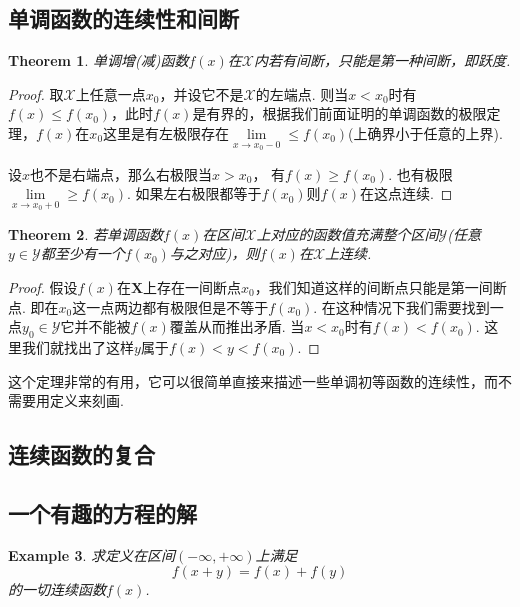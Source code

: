 \documentclass{article}
\newtheorem{theorem}{Theorem}[section]
\newtheorem{example}[theorem]{Example}
\begin{document}
\newpage
\subsection{单调函数的连续性和间断}

\begin{theorem}
\rm 单调增(减)函数$f(x)$在$\mathcal{X}$内若有间断，只能是第一种间断，即跃度.
\end{theorem}

\begin{proof}
取$\mathcal{X}$上任意一点$x_0$，并设它不是$\mathcal{X}$的左端点. 则当$x < x_0$时有$f(x) \leq f(x_0)$，此时$f(x)$是有界的，根据我们前面证明的单调函数的极限定理，$f(x)$在$x_0$这里是有左极限存在$\lim\limits_{x \rightarrow x_0-0} \leq f(x_0)$(上确界小于任意的上界).

设$x$也不是右端点，那么右极限当$x > x_0$， 有$f(x) \geq f(x_0)$. 也有极限$\lim\limits_{x \rightarrow x_0 + 0} \geq f(x_0)$. 如果左右极限都等于$f(x_0)$则$f(x)$在这点连续.
\end{proof}


\begin{theorem}
\rm 若单调函数$f(x)$在区间$\mathcal{X}$上对应的函数值充满整个区间$\mathcal{Y}$(任意$y \in \mathcal{Y}$都至少有一个$f(x_0)$与之对应)，则$f(x)$在$\mathcal{X}$上连续.
\end{theorem}

\begin{proof}
假设$f(x)$在$\mathbf{X}$上存在一间断点$x_0$，我们知道这样的间断点只能是第一间断点. 即在$x_0$这一点两边都有极限但是不等于$f(x_0)$. 在这种情况下我们需要找到一点$y_0 \in \mathcal{Y}$它并不能被$f(x)$覆盖从而推出矛盾. 当$x < x_0$时有$f(x)< f(x_0)$. 这里我们就找出了这样$y$属于$f(x) < y < f(x_0)$.
\end{proof}

这个定理非常的有用，它可以很简单直接来描述一些单调初等函数的连续性，而不需要用定义来刻画.

\newpage
\subsection{连续函数的复合}

\newpage
\subsection{一个有趣的方程的解}

\begin{example}
求定义在区间$(-\infty,+\infty)$上满足
$$
f(x+y) = f(x) + f(y)
$$
的一切连续函数$f(x)$.
\end{example}
\end{document}
